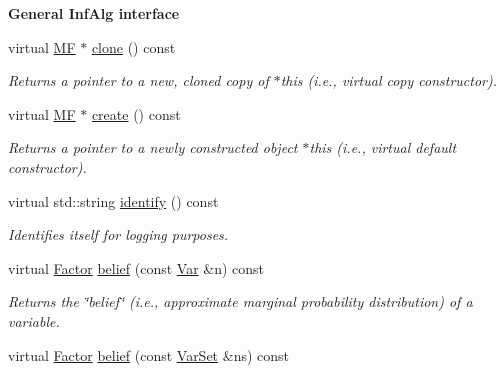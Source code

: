 \begin{Indent}{\bf General InfAlg interface}\par
\begin{CompactItemize}
\item 
\hypertarget{classdai_1_1MF_c209b5cd623a33d0d1b0041d0a7cdf10}{
virtual \hyperlink{classdai_1_1MF}{MF} $\ast$ \hyperlink{classdai_1_1MF_c209b5cd623a33d0d1b0041d0a7cdf10}{clone} () const }
\label{classdai_1_1MF_c209b5cd623a33d0d1b0041d0a7cdf10}

\begin{CompactList}\small\item\em Returns a pointer to a new, cloned copy of $\ast$this (i.e., virtual copy constructor). \item\end{CompactList}\item 
\hypertarget{classdai_1_1MF_d74dbcd156314d1b6072c80917847587}{
virtual \hyperlink{classdai_1_1MF}{MF} $\ast$ \hyperlink{classdai_1_1MF_d74dbcd156314d1b6072c80917847587}{create} () const }
\label{classdai_1_1MF_d74dbcd156314d1b6072c80917847587}

\begin{CompactList}\small\item\em Returns a pointer to a newly constructed object $\ast$this (i.e., virtual default constructor). \item\end{CompactList}\item 
\hypertarget{classdai_1_1MF_f4e80fe7390fbb3e2496b1056b05c5e4}{
virtual std::string \hyperlink{classdai_1_1MF_f4e80fe7390fbb3e2496b1056b05c5e4}{identify} () const }
\label{classdai_1_1MF_f4e80fe7390fbb3e2496b1056b05c5e4}

\begin{CompactList}\small\item\em Identifies itself for logging purposes. \item\end{CompactList}\item 
\hypertarget{classdai_1_1MF_cee4df06c59d8e6ab4663129d59b419e}{
virtual \hyperlink{classdai_1_1TFactor}{Factor} \hyperlink{classdai_1_1MF_cee4df06c59d8e6ab4663129d59b419e}{belief} (const \hyperlink{classdai_1_1Var}{Var} \&n) const }
\label{classdai_1_1MF_cee4df06c59d8e6ab4663129d59b419e}

\begin{CompactList}\small\item\em Returns the \char`\"{}belief\char`\"{} (i.e., approximate marginal probability distribution) of a variable. \item\end{CompactList}\item 
\hypertarget{classdai_1_1MF_704446500780ea4e2b834bb03cff0e24}{
virtual \hyperlink{classdai_1_1TFactor}{Factor} \hyperlink{classdai_1_1MF_704446500780ea4e2b834bb03cff0e24}{belief} (const \hyperlink{classdai_1_1VarSet}{VarSet} \&ns) const }
\label{classdai_1_1MF_704446500780ea4e2b834bb03cff0e24}


\end{CompactItemize}
\end{Indent}
